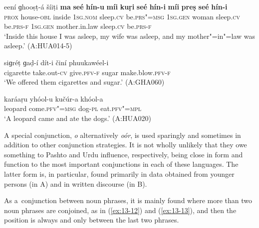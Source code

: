 \begin{exe}
\ex
\label{ex:13-9}
\gll eení ɡhooṣṭ-á šíiṭi \textbf{ma} \textbf{seé} \textbf{hín-u} \textbf{míi} \textbf{kuṛi} \textbf{seé} \textbf{hín-i} \textbf{míi} \textbf{preṣ} \textbf{seé} \textbf{hín-i} \\
\textsc{prox} house-\textsc{obl} inside \textsc{1sg.nom} sleep.\textsc{cv} be.\textsc{prs"=msg}  \textsc{1sg.gen} woman sleep.\textsc{cv} be.\textsc{prs-f } \textsc{1sg.gen} mother.in.law sleep.\textsc{cv} be.\textsc{prs-f} \\
\glt `Inside this house I was asleep, my wife was asleep, and my mother"=in"=law was asleep.' (A:HUA014-5)

\ex
\label{ex:13-10}
\gll siɡréṭ ɡaḍ-í dít-i činí phuukawéel-i\\
cigarette take.out-\textsc{cv} give.\textsc{pfv-f} sugar make.blow.\textsc{pfv-f} \\
\glt `We offered them cigarettes and sugar.' (A:GHA060)

\ex
\label{ex:13-11}
\gll karáaṛu yhóol-u kučúr-a khóol-a  \\
leopard come.\textsc{pfv"=msg} dog-\textsc{pl} eat.\textsc{pfv"=mpl} \\
\glt `A leopard came and ate the dogs.' (A:HUA020) 
\end{exe}

 A special conjunction, \textit{o} alternatively \textit{oór}, is used sparingly and sometimes in addition to other conjunction strategies. It is not wholly unlikely that they owe something to Pashto and Urdu influence, respectively, being close in form and function to the most important conjunctions in each of these languages. The latter form is, in particular, found primarily in data obtained from younger persons (in A) and in written discourse (in B). 


As a~conjunction between noun phrases, it is mainly found where more than two noun phrases are conjoined, as in (\ref{ex:13-12}) and (\ref{ex:13-13}), and then the position is always and only between the last two phrases.

